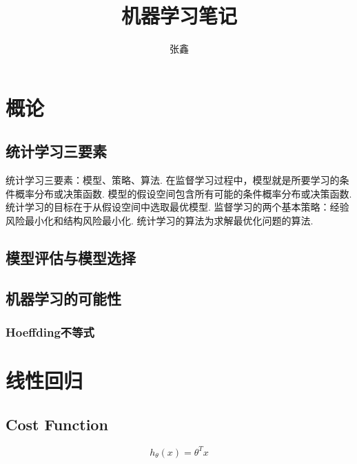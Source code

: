\documentclass[UTF8]{ctexart}
\title{机器学习笔记}
\author{张鑫}
\date{}
\begin{document}
	
	\maketitle

	\section{概论}
	\subsection{统计学习三要素}
	统计学习三要素：模型、策略、算法. 在监督学习过程中，模型就是所要学习的条件概率分布或决策函数. 模型的假设空间包含所有可能的条件概率分布或决策函数. 统计学习的目标在于从假设空间中选取最优模型. 监督学习的两个基本策略：经验风险最小化和结构风险最小化. 统计学习的算法为求解最优化问题的算法.

	\subsection{模型评估与模型选择}
	
	\subsection{机器学习的可能性}
	\subsubsection{Hoeffding不等式}
	
	\section{线性回归}
	
	\subsection{Cost Function}
	\begin{equation*}
		h_\theta(x)=\theta^Tx
	\end{equation*}
\end{document}
